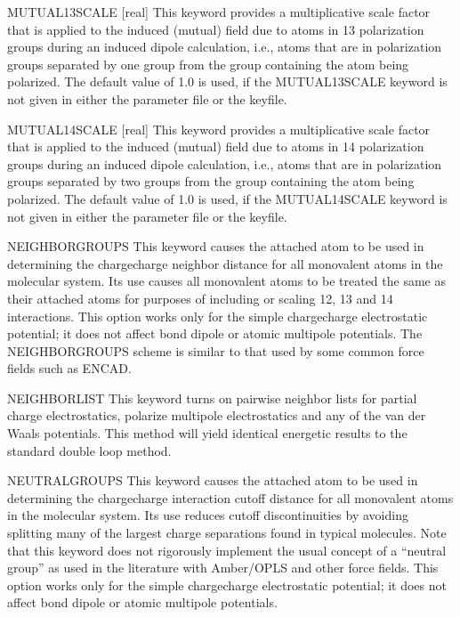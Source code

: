 \documentclass[letterpaper,11pt,english]{sphinxmanual}
\begin{document}
MUTUAL\sphinxhyphen{}13\sphinxhyphen{}SCALE {[}real{]}     This keyword provides a multiplicative scale factor that is applied to the induced (mutual) field due to atoms in 1\sphinxhyphen{}3 polarization groups during an induced dipole calculation, i.e., atoms that are in polarization groups separated by one group from the group containing the atom being polarized. The default value of 1.0 is used, if the MUTUAL\sphinxhyphen{}13\sphinxhyphen{}SCALE keyword is not given in either the parameter file or the keyfile.

MUTUAL\sphinxhyphen{}14\sphinxhyphen{}SCALE {[}real{]}     This keyword provides a multiplicative scale factor that is applied to the induced (mutual) field due to atoms in 1\sphinxhyphen{}4 polarization groups during an induced dipole calculation, i.e., atoms that are in polarization groups separated by two groups from the group containing the atom being polarized. The default value of 1.0 is used, if the MUTUAL\sphinxhyphen{}14\sphinxhyphen{}SCALE keyword is not given in either the parameter file or the keyfile.

NEIGHBOR\sphinxhyphen{}GROUPS     This keyword causes the attached atom to be used in determining the charge\sphinxhyphen{}charge neighbor distance for all monovalent atoms in the molecular system. Its use causes all monovalent atoms to be treated the same as their attached atoms for purposes of including or scaling 1\sphinxhyphen{}2, 1\sphinxhyphen{}3 and 1\sphinxhyphen{}4 interactions. This option works only for the simple charge\sphinxhyphen{}charge electrostatic potential; it does not affect bond dipole or atomic multipole potentials. The NEIGHBOR\sphinxhyphen{}GROUPS scheme is similar to that used by some common force fields such as ENCAD.

NEIGHBOR\sphinxhyphen{}LIST     This keyword turns on pairwise neighbor lists for partial charge electrostatics, polarize multipole electrostatics and any of the van der Waals potentials. This method will yield identical energetic results to the standard double loop method.

NEUTRAL\sphinxhyphen{}GROUPS     This keyword causes the attached atom to be used in determining the charge\sphinxhyphen{}charge interaction cutoff distance for all monovalent atoms in the molecular system. Its use reduces cutoff discontinuities by avoiding splitting many of the largest charge separations found in typical molecules. Note that this keyword does not rigorously implement the usual concept of a “neutral group” as used in the literature with Amber/OPLS and other force fields. This option works only for the simple charge\sphinxhyphen{}charge electrostatic potential; it does not affect bond dipole or atomic multipole potentials.
\end{document}
